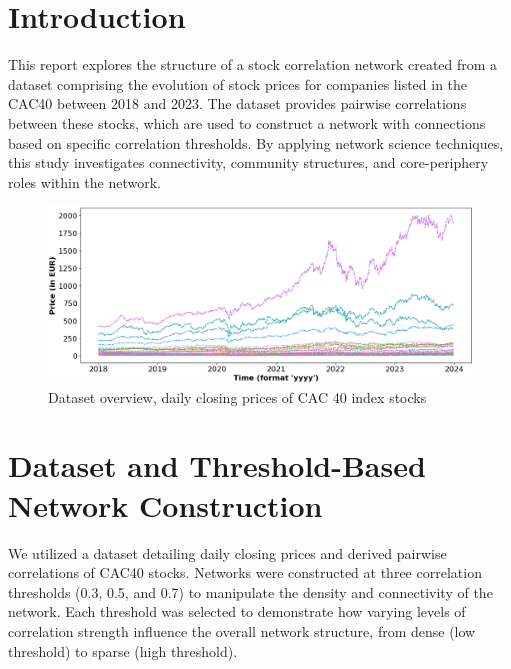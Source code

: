 \documentclass[12pt]{article}
\begin{document}
\section{Introduction}
This report explores the structure of a stock correlation network created from a dataset comprising the evolution of stock prices for companies listed in the CAC40 between 2018 and 2023. The dataset provides pairwise correlations between these stocks, which are used to construct a network with connections based on specific correlation thresholds. By applying network science techniques, this study investigates connectivity, community structures, and core-periphery roles within the network.
\begin{figure}[h!]
  \centering
  \includegraphics[width=\textwidth]{close_price_index_cac40_stocks.png}
  \caption{Dataset overview, daily closing prices of CAC 40 index stocks}
  \label{fig:stock_close_price}
\end{figure}
\section{Dataset and Threshold-Based Network Construction}
We utilized a dataset detailing daily closing prices and derived pairwise correlations of CAC40 stocks. Networks were constructed at three correlation thresholds (0.3, 0.5, and 0.7) to manipulate the density and connectivity of the network. Each threshold was selected to demonstrate how varying levels of correlation strength influence the overall network structure, from dense (low threshold) to sparse (high threshold).
\clearpage
\end{document}
